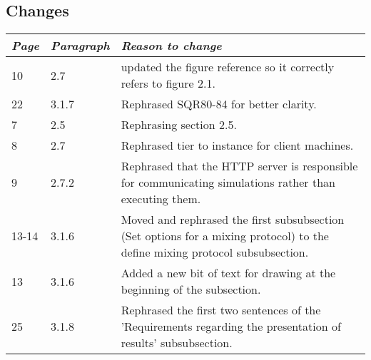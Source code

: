 \subsection*{Changes}
\begin{tabular}{llp{10cm}}
    \toprule
    \emph{Page} & \emph{Paragraph} & \emph{Reason to change} \\
    \midrule
    10 & 2.7 & updated the figure reference so it correctly refers to figure 2.1.\\
    22 & 3.1.7 & Rephrased SQR80-84 for better clarity.\\
    7 & 2.5 & Rephrasing section 2.5.\\
    8 & 2.7 &  Rephrased tier to instance for client machines.\\
    9 & 2.7.2 & Rephrased that the HTTP server is responsible for communicating simulations rather than executing them.\\
    13-14 & 3.1.6 & Moved and rephrased the first subsubsection (Set options for a mixing protocol) to the define mixing protocol subsubsection.\\
    13 & 3.1.6 & Added a new bit of text for drawing at the beginning of the subsection.\\
    25 & 3.1.8 & Rephrased the first two sentences of the 'Requirements regarding the presentation of results' subsubsection.\\
    \bottomrule
\end{tabular}